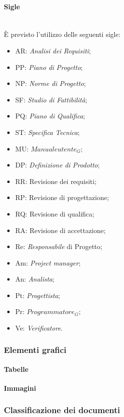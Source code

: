 		\paragraph{Sigle} \mbox{} \\
		È previsto l’utilizzo delle seguenti sigle:
		\begin{itemize}
			\item AR: \textit{Analisi dei Requisiti};
			\item PP: \textit{Piano di Progetto};
			\item NP: \textit{Norme di Progetto};
			\item SF: \textit{Studio di Fattibilità};
			\item PQ: \textit{Piano di Qualifica};
			\item ST: \textit{Specifica Tecnica};
			\item MU: \textit{$Manuale utente_G$};	
			\item DP: \textit{Definizione di Prodotto};
			\item RR: Revisione dei requisiti;
			\item RP: Revisione di progettazione;
			\item RQ: Revisione di qualifica;
			\item RA: Revisione di accettazione;
			\item Re: \textit{Responsabile} di Progetto;
			\item Am: \textit{Project manager};
			\item An: \textit{Analista};
			\item Pt: \textit{Progettista};
			\item Pr: \textit{$Programmatore_G$};
			\item Ve: \textit{Verificatore}.
		\end{itemize}
		
	\subsubsection{Elementi grafici}
		\paragraph{Tabelle}
		\paragraph{Immagini}
	\subsubsection{Classificazione dei documenti}
